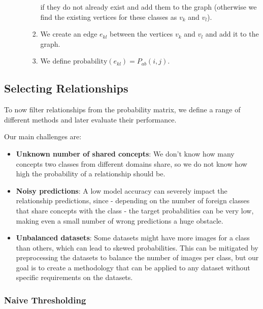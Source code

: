 \begin{enumerate}
\begin{enumerate}
\begin{enumerate}
                              if they do not already exist and add them to the graph
                              (otherwise we find the existing vertices for these classes as $v_k$ and $v_l$).
                        \item We create an edge $e_{kl}$ between the vertices $v_k$ and $v_l$ and add it to the graph.
                        \item We define $\text{probability}(e_{kl}) = P_{ab}(i, j)$.
                    \end{enumerate}
          \end{enumerate}
\end{enumerate}

\subsection{Selecting Relationships}

To now filter relationships from the probability matrix,
we define a range of different methods and later evaluate their performance.

Our main challenges are:

\begin{itemize}
    \item \textbf{Unknown number of shared concepts}: We don't know how many concepts two classes from different
          domains share, so we do not know how high the probability of a relationship should be.
    \item \textbf{Noisy predictions}: A low model accuracy can severely impact the relationship
          predictions, since - depending on the number of foreign classes that share concepts with the class -
          the target probabilities can be very low, making even a small number of wrong predictions
          a huge obstacle.
    \item \textbf{Unbalanced datasets}: Some datasets might have more images for a class than others,
          which can lead to skewed probabilities.
          This can be mitigated by preprocessing the datasets to balance the number of images per class,
          but our goal is to create a methodology that can be applied to any dataset without
          specific requirements on the datasets.
\end{itemize}

\subsubsection{Naive Thresholding}


